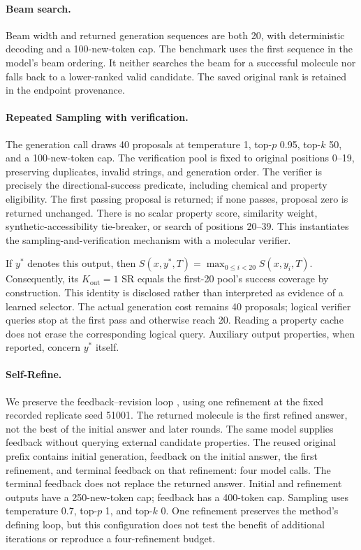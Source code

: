 \paragraph{Beam search.}
Beam width and returned generation sequences are both 20, with deterministic decoding and a 100-new-token cap. The benchmark uses the first sequence in the model's beam ordering. It neither searches the beam for a successful molecule nor falls back to a lower-ranked valid candidate. The saved original rank is retained in the endpoint provenance.

\paragraph{Repeated Sampling with verification.}
The generation call draws 40 proposals at temperature 1, top-$p$ 0.95, top-$k$ 50, and a 100-new-token cap. The verification pool is fixed to original positions 0--19, preserving duplicates, invalid strings, and generation order. The verifier is precisely the directional-success predicate, including chemical and property eligibility. The first passing proposal is returned; if none passes, proposal zero is returned unchanged. There is no scalar property score, similarity weight, synthetic-accessibility tie-breaker, or search of positions 20--39. This instantiates the sampling-and-verification mechanism \citep{repeatedsampling2024} with a molecular verifier.

If $y^*$ denotes this output, then $S(x,y^*,T)=\max_{0\leq i<20}S(x,y_i,T)$. Consequently, its $K_{\mathrm{out}}=1$ SR equals the first-20 pool's success coverage by construction. This identity is disclosed rather than interpreted as evidence of a learned selector. The actual generation cost remains 40 proposals; logical verifier queries stop at the first pass and otherwise reach 20. Reading a property cache does not erase the corresponding logical query. Auxiliary output properties, when reported, concern $y^*$ itself.

\paragraph{Self-Refine.}
We preserve the feedback--revision loop \citep{selfrefine2023}, using one refinement at the fixed recorded replicate seed 51001. The returned molecule is the first refined answer, not the best of the initial answer and later rounds. The same model supplies feedback without querying external candidate properties. The reused original prefix contains initial generation, feedback on the initial answer, the first refinement, and terminal feedback on that refinement: four model calls. The terminal feedback does not replace the returned answer. Initial and refinement outputs have a 250-new-token cap; feedback has a 400-token cap. Sampling uses temperature 0.7, top-$p$ 1, and top-$k$ 0. One refinement preserves the method's defining loop, but this configuration does not test the benefit of additional iterations or reproduce a four-refinement budget.

